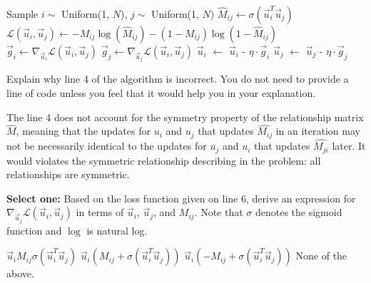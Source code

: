 \documentclass[11pt,addpoints,answers]{exam}
\newcommand{\sone}{\textbf{Select one: }}
\begin{document}
\begin{questions}
\begin{parts}
\begin{algorithm}
\begin{algorithmic}[1]
    \State Sample $i \sim$ Uniform(1, $N$), $j \sim$ Uniform(1, $N$)
    \State $\hat{M}_{ij} \gets \sigma(\vec{u}_i^T \vec{u}_j)$ 
    \State $\mathcal{L}(\vec{u}_i, \vec{u}_j) \gets -M_{ij} \log(\hat{M}_{ij}) - (1-M_{ij})\log(1 - \hat{M}_{ij})$
    \State $\vec{g}_i \gets \nabla_{\vec{u}_i} \mathcal{L}(\vec{u}_i, \vec{u}_j)$
    \State $\vec{g}_j \gets \nabla_{\vec{u}_j} \mathcal{L}(\vec{u}_i, \vec{u}_j)$
    \State $\vec{u}_i$ $\gets$ $\vec{u}_i$ - $\eta \cdot \vec{g}_i$
    \State $\vec{u}_j$ $\gets$ $\vec{u}_j$ - $\eta \cdot \vec{g}_j$
\EndWhile
\end{algorithmic}
\end{algorithm}
\newpage
\begin{subparts}
\subpart[1] Explain why line 4 of the algorithm is incorrect.
You do not need to provide a line of code unless you feel that it would help you in your explanation.

    \begin{your_solution}[title=Explanation, height=3cm, width=0.9\textwidth]
    	The line 4 does not account for the symmetry property of the relationship matrix $\hat{M}$, meaning that the updates for $u_i$ and $u_j$ that updates $\hat{M_{ij}}$ in an iteration may not be necessarily identical to the updates for $u_j$ and $u_i$ that updates $\hat{M_{ji}}$ later. It would violates the symmetric relationship describing in the problem: all relationships are symmetric.
    \end{your_solution}

\subpart[1] \sone Based on the loss function given on line 6, derive an expression for $\nabla_{\vec{u}_j} \mathcal{L}(\vec{u}_i, \vec{u}_j)$ in terms of $\vec{u}_i$, $\vec{u}_j$, and $M_{ij}$. Note that $\sigma$ denotes the sigmoid function and $\log$ is natural log.
    \begin{checkboxes}
    \choice $\vec{u}_i M_{ij} \sigma(\vec{u}_i^T \vec{u}_j)$
    \choice $\vec{u}_i(M_{ij} + \sigma(\vec{u}_i^T \vec{u}_j))$
    \CorrectChoice $\vec{u}_i(-M_{ij} + \sigma(\vec{u}_i^T \vec{u}_j))$
    \choice None of the above.
    \end{checkboxes}
         
    


\end{subparts}
\end{parts}
\end{questions}
\end{document}
